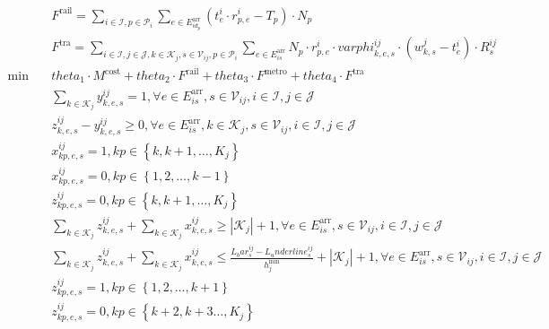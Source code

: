 \begin{align}
  & F^{\text{rail}} = \sum_{i \in \mathcal{I}, p \in \mathcal{P}_{i}} \underset{e \in E_{i d_{p}}^{\text{arr}}}{\sum} \left(t_{e}^{i} \cdot r_{p , e}^{i} - T_{p}\right) \cdot N_{p} \tag{eq\_0045} \\
  & F^{\text{tra}} = \sum_{i \in \mathcal{I}, j \in \mathcal{J}, k \in \mathcal{K}_{j}, s \in \mathcal{V}_{i j}, p \in \mathcal{P}_{i}} \underset{e \in E_{i s}^{\text{arr}}}{\sum} N_{p} \cdot r_{p , e}^{i} \cdot \mathit{varphi}_{k , e , s}^{i j} \cdot \left(w_{k , s}^{j} - t_{e}^{i}\right) \cdot R_{s}^{i j} \tag{eq\_0046} \\
  \min\quad & \mathit{theta}_{1} \cdot M^{\text{cost}} + \mathit{theta}_{2} \cdot F^{\text{rail}} + \mathit{theta}_{3} \cdot F^{\text{metro}} + \mathit{theta}_{4} \cdot F^{\text{tra}} \tag{eq\_0047} \\
  & \sum_{k \in \mathcal{K}_{j}} y_{k , e , s}^{i j} = 1 , \forall e \in E_{i s}^{\text{arr}} , s \in \mathcal{V}_{i j} , i \in \mathcal{I} , j \in \mathcal{J} \tag{eq\_0051} \\
  & z_{k , e , s}^{i j} - y_{k , e , s}^{i j} \geq 0 , \forall e \in E_{i s}^{\text{arr}} , k \in \mathcal{K}_{j} , s \in \mathcal{V}_{i j} , i \in \mathcal{I} , j \in \mathcal{J} \tag{eq\_0052} \\
  & x_{kp , e , s}^{i j} = 1 , kp \in \left\{k , k + 1 , \ldots , K_{j}\right\} \tag{eq\_0053} \\
  & x_{kp , e , s}^{i j} = 0 , kp \in \left\{1 , 2 , \ldots , k - 1\right\} \tag{eq\_0055} \\
  & z_{kp , e , s}^{i j} = 0 , kp \in \left\{k , k + 1 , \ldots , K_{j}\right\} \tag{eq\_0056} \\
  & \sum_{k \in \mathcal{K}_{j}} z_{k , e , s}^{i j} + \sum_{k \in \mathcal{K}_{j}} x_{k , e , s}^{i j} \geq \left|\mathcal{K}_{j}\right| + 1 , \forall e \in E_{i s}^{\text{arr}} , s \in \mathcal{V}_{i j} , i \in \mathcal{I} , j \in \mathcal{J} \tag{eq\_0057} \\
  & \sum_{k \in \mathcal{K}_{j}} z_{k , e , s}^{i j} + \sum_{k \in \mathcal{K}_{j}} x_{k , e , s}^{i j} \leq \frac{L_bar_{s}^{i j} - L_underline_{s}^{i j}}{h_{j}^{\text{min}}} + \left|\mathcal{K}_{j}\right| + 1 , \forall e \in E_{i s}^{\text{arr}} , s \in \mathcal{V}_{i j} , i \in \mathcal{I} , j \in \mathcal{J} \tag{eq\_0058} \\
  & z_{kp , e , s}^{i j} = 1 , kp \in \left\{1 , 2 , \ldots , k + 1\right\} \tag{eq\_0062} \\
  & z_{kp , e , s}^{i j} = 0 , kp \in \left\{k + 2 , k + 3 \hdots , K_{j}\right\} \tag{eq\_0063} \\

\end{align}

